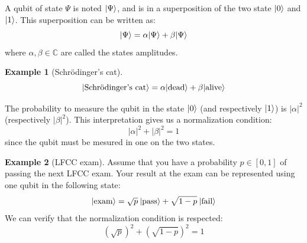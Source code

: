 \documentclass[12pt,a4paper]{article}
\theoremstyle{definition}
\newtheorem*{example}{Example}
\DeclarePairedDelimiter\ket{\lvert}{\rangle}
\begin{document}
A qubit of state $\Psi$ is noted $\ket{\Psi}$, and is in a superposition of the two state $\ket{0}$ and $\ket{1}$. This superposition can be written as:
\begin{equation*}
    \ket{\Psi}=\alpha\ket{\Psi}+\beta\ket{\Psi}
\end{equation*}
where $\alpha, \beta\in \mathbb{C}$ are called the states amplitudes. 

\begin{example}[Schrödinger's cat]
    \begin{equation*}
        \ket{\textnormal{Schrödinger's cat}} = \alpha\ket{\textnormal{dead}} + \beta\ket{\textnormal{alive}}
    \end{equation*}
\end{example}

The probability to measure the qubit in the state $\ket{0}$ (and respectively $\ket{1}$) is $|\alpha|^2$ (respectively $|\beta|^2$). This interpretation gives us a normalization condition:
\begin{equation*}
    |\alpha|^2+|\beta|^2=1
\end{equation*}
since the qubit must be mesured in one on the two states.

\begin{example}[LFCC exam]
    Assume that you have a probability $p\in[0, 1]$ of passing the next LFCC exam. Your result at the exam can be represented using one qubit in the following state:
    \begin{equation*}
        \ket{\textnormal{exam}} = \sqrt{p} \: \ket{\textnormal{pass}}+\sqrt{1-p} \: \ket{\textnormal{fail}}
    \end{equation*}
    We can verify that the normalization condition is respected:
    \begin{equation*}
        (\sqrt{p})^2 + (\sqrt{1-p})^2 = 1
    \end{equation*}
\end{example}
\end{document}
